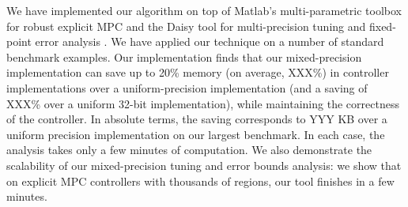 We have implemented our algorithm on top of Matlab's multi-parametric toolbox 
for robust explicit MPC \cite{Matlab-MPT?}
and the Daisy tool for multi-precision tuning and fixed-point error analysis \cite{Daisy}.
We have applied our technique on a number of standard benchmark examples.
Our implementation finds that our mixed-precision implementation can save up to 20\% memory (on average, XXX\%) in controller
implementations over a uniform-precision implementation (and a saving of XXX\% over a uniform 32-bit implementation), while
maintaining the correctness of the controller.
In absolute terms, the saving corresponds to YYY KB over a uniform precision implementation on our largest benchmark.
In each case, the analysis takes only a few minutes of computation.
We also demonstrate the scalability of our mixed-precision tuning and error bounds analysis:
we show that on explicit MPC controllers with thousands of regions, our tool finishes in a few minutes.


